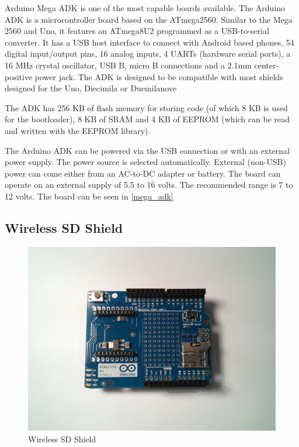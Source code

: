 Arduino Mega ADK \cite{megaAdk} is one of the most capable boards available. 
The Arduino ADK is a microcontroller board based on the ATmega2560. Similar to the Mega 2560 and Uno, it features an ATmega8U2 programmed as a USB-to-serial converter. It has a USB host interface to connect with Android based phones, 54 digital input/output pins, 16 analog inputs, 4 UARTs (hardware serial ports), a 16 MHz crystal oscillator, USB B, micro B connections and a 2.1mm center-positive power jack. The ADK is designed to be compatible with most shields designed for the Uno, Diecimila or Duemilanove

The ADK has 256 KB of flash memory for storing code (of which 8 KB is used for the bootloader), 8 KB of SRAM and 4 KB of EEPROM (which can be read and written with the EEPROM library).

The Arduino ADK can be powered via the USB connection or with an external power supply. The power source is selected automatically. External (non-USB) power can come either from an AC-to-DC adapter or battery. The board can operate on an external supply of 5.5 to 16 volts. The recommended range is 7 to 12 volts. The board can be seen in \autoref{mega_adk}


\subsection{Wireless SD Shield}

\begin{figure}[h!]
\centering
\includegraphics[scale=0.58]{2/figures/wireless_shield.pdf}
\caption{Wireless SD Shield}
\label{wireless_shield}
\end{figure}

